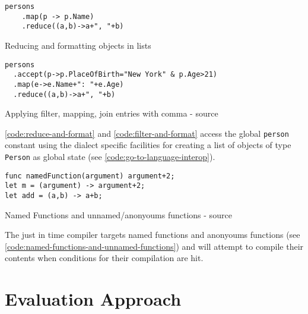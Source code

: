 \begin{listing}[H]
    \begin{verbatim}
persons
    .map(p -> p.Name)
    .reduce((a,b)->a+", "+b)
    \end{verbatim}
    \caption{Reducing and formatting objects in lists}
    \label{code:reduce-and-format}
\end{listing}

\begin{listing}[H]
    \begin{verbatim}
persons
  .accept(p->p.PlaceOfBirth="New York" & p.Age>21)
  .map(e->e.Name+": "+e.Age)
  .reduce((a,b)->a+", "+b)
    \end{verbatim}
    \caption{Applying filter, mapping, join entries with comma - source \cite{parser2_xnacly}}
    \label{code:filter-and-format}
\end{listing}


\autoref{code:reduce-and-format} and \autoref{code:filter-and-format} access
the global \texttt{person} constant using the dialect specific facilities for
creating a list of objects of type \texttt{Person} as global state (see
\autoref{code:go-to-language-interop}).

\begin{listing}[H]
    \begin{verbatim}
func namedFunction(argument) argument+2;
let m = (argument) -> argument+2;
let add = (a,b) -> a+b;
    \end{verbatim}
    \caption{Named Functions and unnamed/anonyoums functions - source \cite{parser2_xnacly}}
    \label{code:named-functions-and-unnamed-functions}
\end{listing}


The just in time compiler targets named functions and anonyoums functions (see
\autoref{code:named-functions-and-unnamed-functions}) and will attempt to
compile their contents when conditions for their compilation are hit.


\section{Evaluation Approach}


